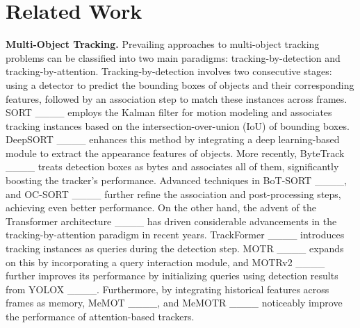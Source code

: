 \section{Related Work}
{\bfseries Multi-Object Tracking.}
Prevailing approaches to multi-object tracking problems can be classified into two main paradigms: tracking-by-detection and tracking-by-attention. Tracking-by-detection involves two consecutive stages: using a detector to predict the bounding boxes of objects and their corresponding features, followed by an association step to match these instances across frames. SORT ____ employs the Kalman filter for motion modeling and associates tracking instances based on the intersection-over-union (IoU) of bounding boxes. DeepSORT ____ enhances this method by integrating a deep learning-based module to extract the appearance features of objects. More recently, ByteTrack ____ treats detection boxes as bytes and associates all of them, significantly boosting the tracker's performance. Advanced techniques in BoT-SORT ____, and OC-SORT ____ further refine the association and post-processing steps, achieving even better performance. On the other hand, the advent of the Transformer architecture ____ has driven considerable advancements in the tracking-by-attention paradigm in recent years. TrackFormer ____ introduces tracking instances as queries during the detection step. MOTR ____ expands on this by incorporating a query interaction module, and MOTRv2 ____ further improves its performance by initializing queries using detection results from YOLOX ____. Furthermore, by integrating historical features across frames as memory, MeMOT ____, and MeMOTR ____ noticeably improve the performance of attention-based trackers.

